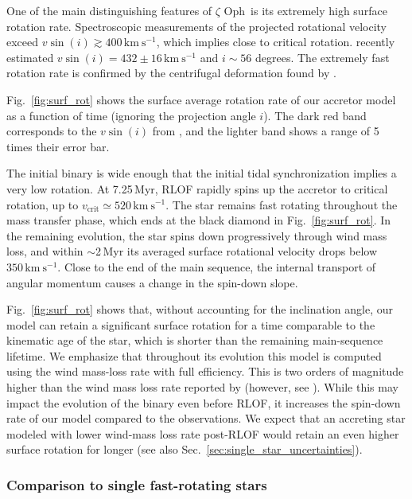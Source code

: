 \documentclass[twocolumn,twocolappendix,trackchanges]{aastex63}
\newcommand{\kms}{{\mathrm{km\ s^{-1}}}}
\DeclareRobustCommand{\Figref}[1]{Fig.~\ref{#1}}
\DeclareRobustCommand{\Secref}[1]{Sec.~\ref{#1}}
\newcommand{\zoph}{$\zeta$ Oph}
\begin{document}
One of the main distinguishing features of \zoph\ is its extremely
high surface rotation rate. Spectroscopic measurements of the
projected rotational velocity exceed $v\sin(i)\gtrsim 400\,\kms$,
which implies close to critical rotation. \cite{zehe:18} recently
estimated $v\sin(i)=432\pm16\,\kms$ and $i\sim56$ degrees. The
extremely fast rotation rate is confirmed by the centrifugal
deformation found by \cite{gordon:18}.

\Figref{fig:surf_rot} shows the surface average rotation rate of our
accretor model as a function of time (ignoring the projection angle
$i$). The dark red band corresponds to the $v\sin(i)$ from
\cite{zehe:18}, and the lighter band shows a range of 5 times their
error bar.

The initial binary is wide enough that the initial tidal
synchronization implies a very low rotation. At 7.25\,Myr, RLOF
rapidly spins up the accretor to critical rotation, up to
$v_\mathrm{crit}\simeq520\,\kms$. The star remains fast rotating
throughout the mass transfer phase, which ends at the black diamond in
\Figref{fig:surf_rot}. In the remaining evolution, the star spins down
progressively through wind mass loss, and within $\sim$2\,Myr its
averaged surface rotational velocity drops below $350\,\kms$. Close to
the end of the main sequence, the internal transport of angular
momentum causes a change in the spin-down slope.

\Figref{fig:surf_rot} shows that, without accounting for the
inclination angle, our model can retain a significant surface rotation
for a time comparable to the kinematic age of the star, which is
shorter than the remaining main-sequence lifetime. We emphasize that
throughout its evolution this model is computed using the
\cite{vink:00, vink:01} wind mass-loss rate with full efficiency. This
is two orders of magnitude higher than the wind mass loss rate
reported by \cite{marcolino:09} (however, see
\citealt{lucy:12}). While this may impact the evolution of the
binary even before RLOF, it increases the spin-down rate of
our model compared to the observations. We expect that an accreting star
modeled with lower wind-mass loss rate post-RLOF would retain an even
higher surface rotation for longer (see also \Secref{sec:single_star_uncertainties}).


\subsubsection{Comparison to single fast-rotating stars}
\end{document}
